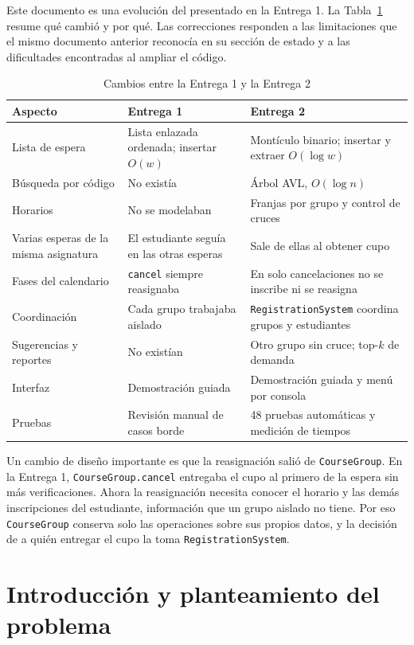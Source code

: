 \documentclass[conference]{IEEEtran}
\begin{document}
Este documento es una evolución del presentado en la Entrega 1. La Tabla~\ref{tab:cambios} resume qué cambió y por qué. Las correcciones responden a las limitaciones que el mismo documento anterior reconocía en su sección de estado y a las dificultades encontradas al ampliar el código.

\begin{table}[htbp]
\caption{Cambios entre la Entrega 1 y la Entrega 2}
\label{tab:cambios}
\centering
\footnotesize
\begin{tabular}{@{}p{2.5cm} p{2.4cm} p{2.6cm}@{}}
\toprule
\textbf{Aspecto} & \textbf{Entrega 1} & \textbf{Entrega 2} \\
\midrule
Lista de espera & Lista enlazada ordenada; insertar $O(w)$ & Montículo binario; insertar y extraer $O(\log w)$ \\
Búsqueda por código & No existía & Árbol AVL, $O(\log n)$ \\
Horarios & No se modelaban & Franjas por grupo y control de cruces \\
Varias esperas de la misma asignatura & El estudiante seguía en las otras esperas & Sale de ellas al obtener cupo \\
Fases del calendario & \texttt{cancel} siempre reasignaba & En solo cancelaciones no se inscribe ni se reasigna \\
Coordinación & Cada grupo trabajaba aislado & \texttt{RegistrationSystem} coordina grupos y estudiantes \\
Sugerencias y reportes & No existían & Otro grupo sin cruce; top-$k$ de demanda \\
Interfaz & Demostración guiada & Demostración guiada y menú por consola \\
Pruebas & Revisión manual de casos borde & 48 pruebas automáticas y medición de tiempos \\
\bottomrule
\end{tabular}
\end{table}

Un cambio de diseño importante es que la reasignación salió de \texttt{CourseGroup}. En la Entrega 1, \texttt{CourseGroup.cancel} entregaba el cupo al primero de la espera sin más verificaciones. Ahora la reasignación necesita conocer el horario y las demás inscripciones del estudiante, información que un grupo aislado no tiene. Por eso \texttt{CourseGroup} conserva solo las operaciones sobre sus propios datos, y la decisión de a quién entregar el cupo la toma \texttt{RegistrationSystem}.

\section{Introducción y planteamiento del problema}
\end{document}
